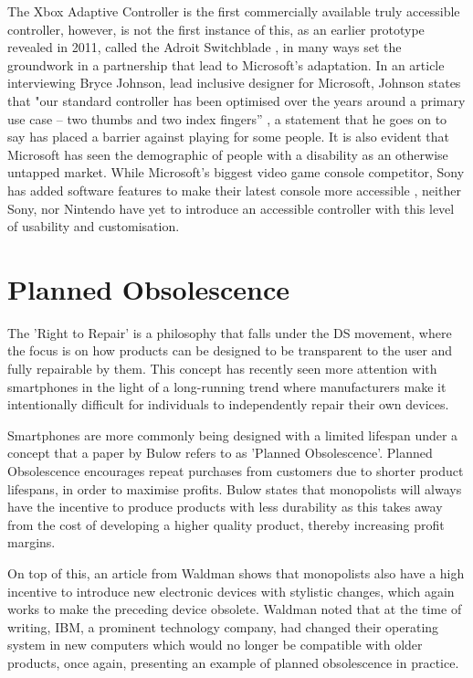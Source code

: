 The Xbox Adaptive Controller is the first commercially available truly accessible controller, however, is not the first instance of this, as an earlier prototype revealed in 2011, called the Adroit Switchblade \cite{ablegamer}, in many ways set the groundwork in a partnership that lead to Microsoft's adaptation.
In an article interviewing Bryce Johnson, lead inclusive designer for Microsoft, Johnson states that "our standard controller has been optimised over the years around a primary use case – two thumbs and two index fingers” \cite{disabilitygaming}, a statement that he goes on to say has placed a barrier against playing for some people.
It is also evident that Microsoft has seen the demographic of people with a disability as an otherwise untapped market.
While Microsoft's biggest video game console competitor, Sony has added software features to make their latest console more accessible \cite{sony}, neither Sony, nor Nintendo have yet to introduce an accessible controller with this level of usability and customisation.


\section{Planned Obsolescence}

The 'Right to Repair' is a philosophy that falls under the DS movement, where the focus is on how products can be designed to be transparent to the user and fully repairable by them.
This concept has recently seen more attention with smartphones in the light of a long-running trend where manufacturers make it intentionally difficult for individuals to independently repair their own devices.

Smartphones are more commonly being designed with a limited lifespan under a concept that a paper by Bulow \cite{obsolescence} refers to as 'Planned Obsolescence'.
Planned Obsolescence encourages repeat purchases from customers due to shorter product lifespans, in order to maximise profits.
Bulow states that monopolists will always have the incentive to produce products with less durability as this takes away from the cost of developing a higher quality product, thereby increasing profit margins.

On top of this, an article from Waldman \cite{obsolescence2} shows that monopolists also have a high incentive to introduce new electronic devices with stylistic changes, which again works to make the preceding device obsolete.
Waldman noted that at the time of writing, IBM, a prominent technology company, had changed their operating system in new computers which would no longer be compatible with older products, once again, presenting an example of planned obsolescence in practice.

